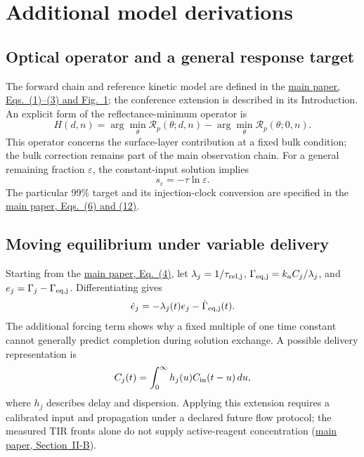 \documentclass[lettersize,journal]{IEEEtran}
\newcommand{\mainpaper}[1]{\href{SPR_smart_stop_current.pdf}{main paper, #1}}
\begin{document}
\section{Additional model derivations}
\subsection{Optical operator and a general response target}
The forward chain and reference kinetic model are defined in the
\mainpaper{Eqs.~(1)--(3) and Fig.~1}; the conference extension is described
in its Introduction. An explicit form of the reflectance-minimum operator is
\begin{equation}
 H(d,n)=\arg\min_\theta\mathcal R_p(\theta;d,n)
       -\arg\min_\theta\mathcal R_p(\theta;0,n).
\end{equation}
This operator concerns the surface-layer contribution at a fixed bulk
condition; the bulk correction remains part of the main observation chain.
For a general remaining fraction $\varepsilon$, the constant-input solution
implies
\begin{equation}\label{eq:virtualtime}
 s_\varepsilon=-\tau\ln\varepsilon.
\end{equation}
The particular 99\% target and its injection-clock conversion are specified
in the \mainpaper{Eqs.~(6) and (12)}.

\subsection{Moving equilibrium under variable delivery}
Starting from the \mainpaper{Eq.~(4)}, let
$\lambda_j=1/\tau_{\rm rel,j}$,
$\Gamma_{\rm eq,j}=k_aC_j/\lambda_j$, and
$e_j=\Gamma_j-\Gamma_{\rm eq,j}$. Differentiating gives
\begin{equation}
 \dot e_j=-\lambda_j(t)e_j-\dot\Gamma_{\rm eq,j}(t).
\end{equation}
The additional forcing term shows why a fixed multiple of one time constant
cannot generally predict completion during solution exchange. A possible
delivery representation is
\begin{equation}
 C_j(t)=\int_0^\infty h_j(u)C_{\rm in}(t-u)\,du,
\end{equation}
where $h_j$ describes delay and dispersion. Applying this extension requires
a calibrated input and propagation under a declared future flow protocol;
the measured TIR fronts alone do not supply active-reagent concentration
(\mainpaper{Section~II-B}).
\end{document}

